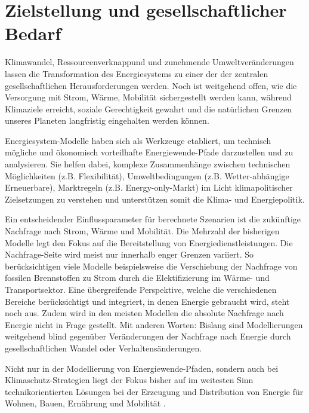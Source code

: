 \documentclass[a4paper,11pt,twoside]{scrartcl}
\begin{document}
\onehalfspacing

\clearpage


{\singlespacing

}

\setcounter{page}{1}

\section{Zielstellung und gesellschaftlicher Bedarf}

Klimawandel, Ressourcenverknappund und zunehmende Umweltveränderungen lassen die Transformation des Energiesystems zu einer der der zentralen gesellschaftlichen Herausforderungen werden. Noch ist weitgehend offen, wie die Versorgung mit Strom, Wärme, Mobilität sichergestellt werden kann, während Klimaziele erreicht, soziale Gerechtigkeit gewahrt und die natürlichen Grenzen unseres Planeten langfristig eingehalten werden können. 

Energiesystem-Modelle haben sich als Werkzeuge etabliert, um technisch mögliche und ökonomisch vorteilhafte Energiewende-Pfade darzustellen und zu analysieren. Sie helfen dabei, komplexe Zusammenhänge zwischen technischen Möglichkeiten (z.B. Flexibilität), Umweltbedingungen (z.B. Wetter-abhängige Erneuerbare), Marktregeln (z.B. Energy-only-Markt) im Licht klimapolitischer Zielsetzungen zu verstehen und unterstützen somit die Klima- und Energiepolitik.

Ein entscheidender Einflussparameter für berechnete Szenarien ist die zukünftige Nachfrage nach Strom, Wärme und Mobilität. Die Mehrzahl der bisherigen Modelle legt den Fokus  auf die Bereitstellung von Energiedienstleistungen. Die Nachfrage-Seite wird meist nur innerhalb enger Grenzen variiert. So berücksichtigen viele Modelle beispielsweise die Verschiebung der Nachfrage von fossilen Brennstoffen zu Strom durch die Elektifizierung im Wärme- und Transportsektor. Eine übergreifende Perspektive, welche die verschiedenen Bereiche berücksichtigt und integriert, in denen Energie gebraucht wird, steht noch aus. Zudem wird in den meisten Modellen die absolute Nachfrage nach Energie nicht in Frage gestellt. Mit anderen Worten: Bislang sind Modellierungen weitgehend blind gegenüber Veränderungen der Nachfrage nach Energie durch gesellschaftlichen Wandel oder Verhaltensänderungen.

Nicht nur in der Modellierung von Energiewende-Pfaden, sondern auch  bei Klimaschutz-Strategien liegt der Fokus bisher auf im weitesten Sinn technikorientierten Lösungen bei der Erzeugung und Distribution von Energie für Wohnen, Bauen, Ernährung und Mobilität \cite{Creutzig2018}. 
\end{document}
